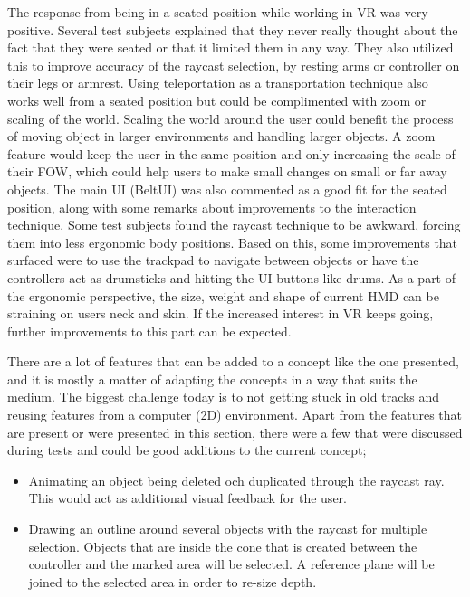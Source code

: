 The response from being in a seated position while working in VR was very positive. Several test subjects explained that they never really thought about the fact that they were seated or that it limited them in any way. They also utilized this to improve accuracy of the raycast selection, by resting arms or controller on their legs or armrest.
Using teleportation as a transportation technique also works well from a seated position but could be complimented with zoom or scaling of the world. Scaling the world around the user could benefit the process of moving object in larger environments and handling larger objects. A zoom feature would keep the user in the same position and only increasing the scale of their FOW, which could help users to make small changes on small or far away objects. The main UI (BeltUI) was also commented as a good fit for the seated position, along with some remarks about improvements to the interaction technique. Some test subjects found the raycast technique to be awkward, forcing them into less ergonomic body positions. Based on this, some improvements that surfaced were to use the trackpad to navigate between objects or have the controllers act as drumsticks and hitting the UI buttons like drums. As a part of the ergonomic perspective, the size, weight and shape of current HMD can be straining on users neck and skin. If the increased interest in VR keeps going, further improvements to this part can be expected.

There are a lot of features that can be added to a concept like the one presented, and it is mostly a matter of adapting the concepts in a way that suits the medium. The biggest challenge today is to not getting stuck in old tracks and reusing features from a computer (2D) environment. Apart from the features that are present or were presented in this section, there were a few that were discussed during tests and could be good additions to the current concept;

\begin{itemize}
  \item Animating an object being deleted och duplicated through the raycast ray. This would act as additional visual feedback for the user.
  \item Drawing an outline around several objects with the raycast for multiple selection. Objects that are inside the cone that is created between the controller and the marked area will be selected. A reference plane will be joined to the selected area in order to re-size depth.
\end{itemize}
